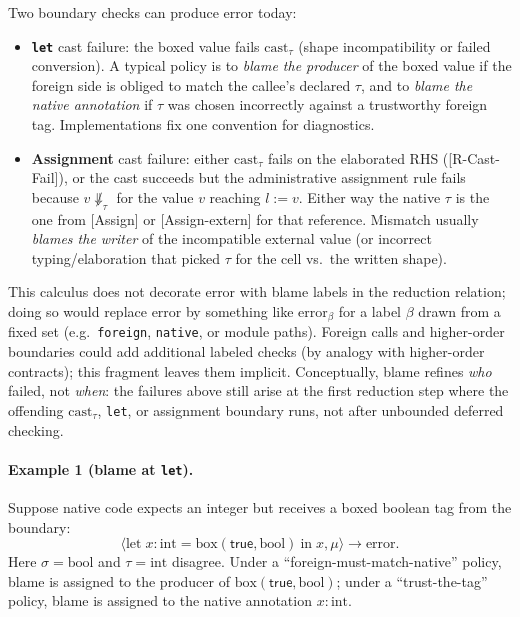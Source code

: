 \documentclass[11pt,a4paper]{article}
\begin{document}
Two boundary checks can produce $\text{error}$ today:
\begin{itemize}
  \item \textbf{\texttt{let}} cast failure: the boxed value fails $\text{cast}_{\tau}$ (shape incompatibility or failed conversion). A typical policy is to \emph{blame the producer} of the boxed value if the foreign side is obliged to match the callee's declared $\tau$, and to \emph{blame the native annotation} if $\tau$ was chosen incorrectly against a trustworthy foreign tag. Implementations fix one convention for diagnostics.
  \item \textbf{Assignment} cast failure: either $\text{cast}_{\tau}$ fails on the elaborated RHS (\textsf{[R-Cast-Fail]}), or the cast succeeds but the administrative assignment rule fails because $v \not\Downarrow_{\tau}$ for the value $v$ reaching $l \mathrel{:=} v$. Either way the native $\tau$ is the one from \textsf{[{Assign}]} or \textsf{[{Assign-extern}]} for that reference. Mismatch usually \emph{blames the writer} of the incompatible external value (or incorrect typing/elaboration that picked $\tau$ for the cell vs.\ the written shape).
\end{itemize}

This calculus does not decorate $\text{error}$ with blame labels in the reduction relation; doing so would replace $\text{error}$ by something like $\text{error}_\beta$ for a label $\beta$ drawn from a fixed set (e.g.\ \texttt{foreign}, \texttt{native}, or module paths).
Foreign calls and higher-order boundaries could add additional labeled checks (by analogy with higher-order contracts); this fragment leaves them implicit.
Conceptually, blame refines \emph{who} failed, not \emph{when}: the failures above still arise at the first reduction step where the offending $\text{cast}_{\tau}$, \texttt{let}, or assignment boundary runs, not after unbounded deferred checking.

\paragraph{Example 1 (blame at \texttt{let}).}
Suppose native code expects an integer but receives a boxed boolean tag from the boundary:
\[
  \langle \text{let}\; x{:}\text{int} = \text{box}(\textsf{true}, \text{bool})\ \text{in}\; x, \mu \rangle \to \text{error}.
\]
Here $\sigma=\text{bool}$ and $\tau=\text{int}$ disagree.
Under a ``foreign-must-match-native'' policy, blame is assigned to the producer of $\text{box}(\textsf{true}, \text{bool})$; under a ``trust-the-tag'' policy, blame is assigned to the native annotation $x{:}\text{int}$.
\end{document}
